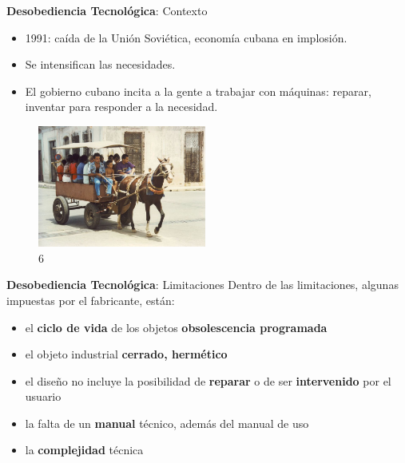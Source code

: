 \documentclass[spanish]{beamer}
\begin{document}
\begin{frame}{\textbf{Desobediencia Tecnológica}: Contexto}   
    \begin{itemize}        
        \item 1991: caída de la Unión Soviética, economía cubana en implosión.
        \item Se intensifican las necesidades.
        \item El gobierno cubano incita a la gente a trabajar con máquinas: reparar, inventar para responder a la necesidad.        
    \end{itemize}
    \begin{figure}
        \includegraphics[height=4cm]{img/periodo_especial.jpg}
        \vspace*{-3mm}
        \caption{ 6}
    \end{figure}
\end{frame}

\begin{frame}{\textbf{Desobediencia Tecnológica}: Limitaciones}      
    Dentro de las limitaciones, algunas impuestas por el fabricante, están:
    
    \begin{itemize}
        \item el \textbf{ciclo de vida} de los objetos \MVRightArrow{} \textbf{obsolescencia programada}
        \item el objeto industrial \textbf{cerrado, hermético}
        \item el diseño no incluye la posibilidad de \textbf{reparar} o de ser \textbf{intervenido} por el usuario
        \item la falta de un \textbf{manual} técnico, además del manual de uso
        \item la \textbf{complejidad} técnica       
    \end{itemize}    
\end{frame}
\end{document}

